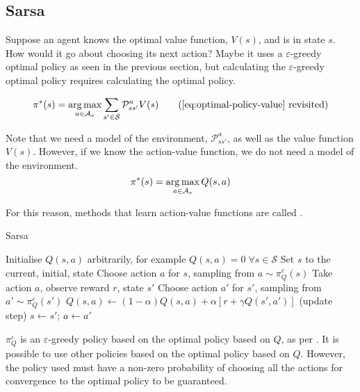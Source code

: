 \citep[Section~2.2]{sutton1998introduction}

\subsection{Sarsa\label{subsec:sarsa}}

Suppose an agent knows the optimal value function, $V(s)$, and is in state $s$.
How would it go about choosing its next action? Maybe it uses a
$\varepsilon$-greedy optimal policy as seen in the previous section, but
calculating the $\varepsilon$-greedy optimal policy requires calculating the
optimal policy.

\begin{equation}
  \pi^*(s) = \argmax_{a\in\mathcal{A}_s} \sum_{s'\in\mathcal{S}}\mathcal{P}^a_{ss'}V(s)
  \tag{\ref{eq:optimal-policy-value} revisited}
\end{equation}

Note that we need a model of the environment, $\mathcal{P}^a_{ss'}$, as well as the
value function $V(s)$. However, if we know the action-value function, we do not
need a model of the environment.
\begin{equation}
  \pi^*(s) = \argmax_{a\in\mathcal{A}_s} Q(s, a)
  \label{eq:q-policy}
\end{equation}

For this reason, methods that learn action-value functions are called
 \citep[Subsection~21.3.2]{russell2009aima}.

\begin{algorithm}[h]
\caption{Sarsa \citep[Section~6.4]{sutton1998introduction}}
\label{alg:sarsa}
\begin{algorithmic}
\State Initialise $Q(s, a)$ arbitrarily, for example $Q(s, a)=0 \; \forall
s\in\mathcal{S}$
  \State Set $s$ to the current, initial, state
  \State Choose action $a$ for $s$, sampling from $a \sim \pi^\varepsilon_Q(s)$
    \State Take action $a$, observe reward $r$, state $s'$
    \State Choose action $a'$ for $s'$, sampling from $a' \sim \pi^\varepsilon_Q(s')$
    \State $Q(s, a) \gets (1-\alpha)Q(s,a) +
      \alpha \left[r + \gamma Q(s', a') \right]$ (update step)
    \State $s \gets s'$; $a \gets a'$
\EndRepeatComment
\end{algorithmic}
\end{algorithm}

$\pi^\varepsilon_Q$ is an $\varepsilon$-greedy policy based on
the optimal policy based on $Q$, as per . It is
possible to use other policies based on the optimal policy based on $Q$. However,
the policy used must have a non-zero probability of choosing all the actions for
convergence to the optimal policy to be guaranteed.

